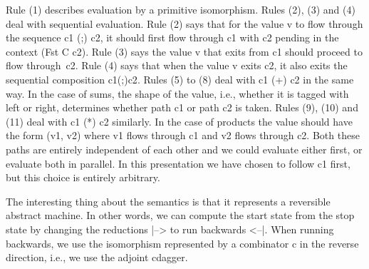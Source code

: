 \documentclass[preprint]{sigplanconf}
\begin{document}
\begin{scriptsize}
\end{scriptsize}
Rule (1) describes evaluation by a primitive isomorphism. Rules (2), (3) and
(4) deal with sequential evaluation. Rule (2) says that for the value {{v}}
to flow through the sequence {{c1 (;) c2}}, it should first flow through
{{c1}} with {{c2}} pending in the context ({{Fst C c2}}). Rule (3) says the
value {{v}} that exits from {{c1}} should proceed to flow
through~{{c2}}. Rule (4) says that when the value {{v}} exits {{c2}}, it also
exits the sequential composition {{c1(;)c2}}. Rules (5) to (8) deal with 
{{c1 (+) c2}} in the same way. In the case of sums, the shape of the value,
i.e., whether it is tagged with {{left}} or {{right}}, determines whether
path {{c1}} or path {{c2}} is taken. Rules (9), (10) and (11) deal with 
{{c1 (*) c2}} similarly. In the case of products the value should have the
form {{(v1, v2)}} where {{v1}} flows through {{c1}} and {{v2}} flows through
{{c2}}. Both these paths are entirely independent of each other and we could
evaluate either first, or evaluate both in parallel. In this presentation we
have chosen to follow {{c1}} first, but this choice is entirely arbitrary.

The interesting thing about the semantics is that it represents a reversible
abstract machine. In other words, we can compute the start state from the
stop state by changing the reductions {{|-->}} to run backwards
{{<--|}}. When running backwards, we use the isomorphism represented by a
combinator {{c}} in the reverse direction, i.e., we use the adjoint
{{c{dagger}}}.
\end{document}
